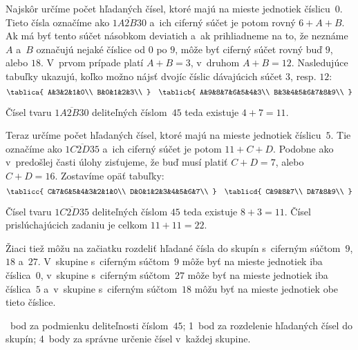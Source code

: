{Najskôr určíme počet hľadaných čísel, ktoré majú na mieste jednotiek číslicu~$0$.
Tieto čísla označíme ako $\overline{1A2B30}$ a~ich ciferný súčet je potom rovný
$6+A+B$.
Ak má byť tento súčet násobkom deviatich a~ak prihliadneme na to, že neznáme
$A$ a~$B$ označujú nejaké číslice od $0$ po $9$, môže byť ciferný súčet rovný buď $9$, alebo $18$.
V~prvom prípade platí $A+B=3$, v~druhom $A+B=12$.
Nasledujúce tabuľky ukazujú, koľko možno nájsť dvojíc číslic dávajúcich
súčet $3$, resp. $12$:
$$
\tablica{
A&3&2&1&0\\
B&0&1&2&3\\
}
\quad
\tablicb{
A&9&8&7&6&5&4&3\\
B&3&4&5&6&7&8&9\\
}
$$

Čísel tvaru $\overline{1A2B30}$ deliteľných číslom~$45$ teda existuje $4+7=11$.

Teraz určíme počet hľadaných čísel, ktoré majú na mieste jednotiek číslicu~$5$.
Tie označíme ako $\overline{1C2D35}$ a~ich ciferný súčet je potom $11+C+D$.
Podobne ako v~predošlej časti úlohy zisťujeme, že buď musí platiť $C+D=7$, alebo $C+D=16$.
Zostavíme opäť tabuľky:
$$
\tablicc{
C&7&6&5&4&3&2&1&0\\
D&0&1&2&3&4&5&6&7\\
}
\quad
\tablicd{
C&9&8&7\\
D&7&8&9\\
}
$$

Čísel tvaru $\overline{1C2D35}$ deliteľných číslom $45$ teda existuje $8+3=11$.
Čísel prislúchajúcich zadaniu je celkom $11+11=22$.

\poznamka
Žiaci tiež môžu na začiatku rozdeliť hľadané čísla do skupín s~ciferným súčtom~$9$, $18$ a~$27$.
V~skupine s~ciferným súčtom~$9$ môže byť na mieste jednotiek iba číslica~$0$,
v~skupine s~ciferným súčtom~$27$ môže byť na mieste jednotiek iba číslica~$5$
a~v~skupine s~ciferným súčtom~$18$ môžu byť na mieste jednotiek obe tieto
číslice.

~bod za podmienku deliteľnosti číslom~$45$;
1~bod za rozdelenie hľadaných čísel do skupín;
4~body za správne určenie čísel v~každej skupine.
\endhodnotenie
}

